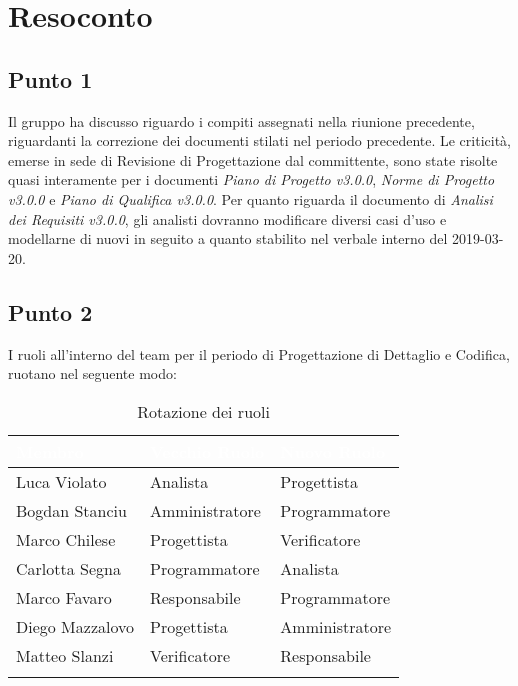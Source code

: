 \section{Resoconto}

\subsection{Punto 1}
Il gruppo ha discusso riguardo i compiti assegnati nella riunione precedente, riguardanti la correzione dei documenti stilati nel periodo precedente. Le criticità, emerse in sede di Revisione di Progettazione dal committente, sono state risolte quasi interamente per i documenti \textit{Piano di Progetto v3.0.0}, \textit{Norme di Progetto v3.0.0} e \textit{Piano di Qualifica v3.0.0}. Per quanto riguarda il documento di \textit{Analisi dei Requisiti v3.0.0}, gli analisti dovranno modificare diversi casi d'uso e modellarne di nuovi in seguito a quanto stabilito nel verbale interno del 2019-03-20.
\\

\subsection{Punto 2}
I ruoli all'interno del team per il periodo di Progettazione di Dettaglio e Codifica, ruotano nel seguente modo:\\

\begin{center}
	\begin{longtable}[c]{|m{}|m{}|m{}|} 
		\hline
		\rowcolor{bluelogo}\textbf{\textcolor{white}{Membro}} & \textbf{\textcolor{white}{Vecchio Ruolo}} & \textbf{\textcolor{white}{Nuovo Ruolo}}\\
		\hline
		\hline
		Luca Violato & Analista & Progettista \\
		\hline
		\rowcolor{grigio}Bogdan Stanciu & Amministratore & Programmatore \\
		\hline
		Marco Chilese & Progettista & Verificatore\\
		\hline
		\rowcolor{grigio}Carlotta Segna & Programmatore & Analista\\
		\hline
		Marco Favaro & Responsabile & Programmatore \\
		\hline
		\rowcolor{grigio} Diego Mazzalovo & Progettista & Amministratore\\
		\hline
		Matteo Slanzi & Verificatore & Responsabile\\
		\hline
		\caption{Rotazione dei ruoli}
	\end{longtable}

\end{center}
	
